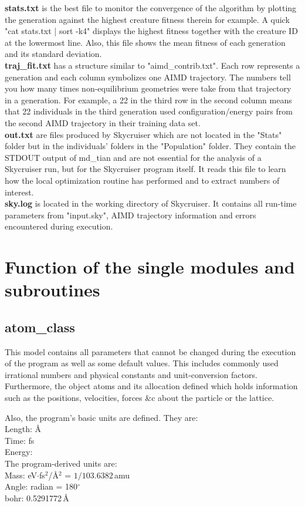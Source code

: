 \documentclass[twoside, 11pt, titlepage, captions=nooneline, a4paper, headsepline]{scrbook}%
\newcommand{\9}{\mathrm}
\newcommand{\0}{\,\mathrm}
\begin{document}
\textbf{stats.txt} is the best file to monitor the convergence of the algorithm by plotting the generation against the highest creature fitness therein for example. A quick "cat stats.txt | sort -k4" displays the highest fitness together with the creature ID at the lowermost line. Also, this file shows the mean fitness of each generation and its standard deviation.\\
\textbf{traj\_fit.txt} has a structure similar to "aimd\_contrib.txt". Each row represents a generation and each column symbolizes one AIMD trajectory. The numbers tell you how many times non-equilibrium geometries were take from that trajectory in a generation. For example, a 22 in the third row in the second column means that 22 individuals in the third generation used configuration/energy pairs from the second AIMD trajectory in their training data set.\\
\textbf{out.txt} are files produced by Skycruiser which are not located in the "Stats" folder but in the individuals' folders in the "Population" folder. They contain the STDOUT output of md\_tian and are not essential for the analysis of a Skycruiser run, but for the Skycruiser program itself. It reads this file to learn how the local optimization routine has performed and to extract numbers of interest.\\
\textbf{sky.log} is located in the working directory of Skycruiser. It contains all run-time parameters from "input.sky", AIMD trajectory information and errors encountered during execution.






\chapter{Function of the single modules and subroutines}
\section{atom\_class}
This model contains all parameters that cannot be changed during the execution of the program as well as some default values. This includes commonly used irrational numbers and physical constants and unit-conversion factors. Furthermore, the object atoms and its allocation defined which holds information such as the positions, velocities, forces \&c about the particle or the lattice.

Also, the program's basic units   are defined. They are:\\
Length: \AA\\
Time: fs\\
Energy: \\
The program-derived units are:\\
Mass: eV$\cdot$fs$^2$/\AA$^2$ = $1/103.6382$\,amu\\
Angle: radian = 180$^\circ$\\
bohr: 0.5291772\,\AA
\end{document}
